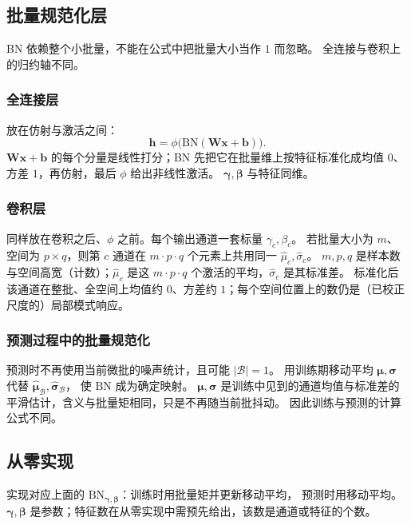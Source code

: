 \subsection{批量规范化层}

BN 依赖整个小批量，不能在公式中把批量大小当作 $1$ 而忽略。
全连接与卷积上的归约轴不同。

\subsubsection{全连接层}

放在仿射与激活之间：
\[
\bm{h}
=
\phi\bigl(\mathrm{BN}(\bm{W}\bm{x}+\bm{b})\bigr).
\]
$\bm{W}\bm{x}+\bm{b}$ 的每个分量是线性打分；BN 先把它在批量维上按特征标准化成均值 $0$、方差 $1$，再仿射，最后 $\phi$ 给出非线性激活。
$\bm{\gamma},\bm{\beta}$ 与特征同维。

\subsubsection{卷积层}

同样放在卷积之后、$\phi$ 之前。每个输出通道一套标量 $\gamma_c,\beta_c$。
若批量大小为 $m$、空间为 $p\times q$，则第 $c$ 通道在 $m\cdot p\cdot q$ 个元素上共用同一
$\hat{\mu}_c,\hat{\sigma}_c$。
$m,p,q$ 是样本数与空间高宽（计数）；$\hat{\mu}_c$ 是这 $m\cdot p\cdot q$ 个激活的平均，$\hat{\sigma}_c$ 是其标准差。
标准化后该通道在整批、全空间上均值约 $0$、方差约 $1$；每个空间位置上的数仍是（已校正尺度的）局部模式响应。

\subsubsection{预测过程中的批量规范化}

预测时不再使用当前微批的噪声统计，且可能 $|\mathcal{B}|=1$。
用训练期移动平均 $\bm{\mu},\bm{\sigma}$ 代替 $\hat{\bm{\mu}}_{\mathcal{B}},\hat{\bm{\sigma}}_{\mathcal{B}}$，
使 $\mathrm{BN}$ 成为确定映射。
$\bm{\mu},\bm{\sigma}$ 是训练中见到的通道均值与标准差的平滑估计，含义与批量矩相同，只是不再随当前批抖动。
因此训练与预测的计算公式不同。

\subsection{从零实现}

实现对应上面的 $\mathrm{BN}_{\bm{\gamma},\bm{\beta}}$：训练时用批量矩并更新移动平均，
预测时用移动平均。$\bm{\gamma},\bm{\beta}$ 是参数；特征数在从零实现中需预先给出，该数是通道或特征的个数。

